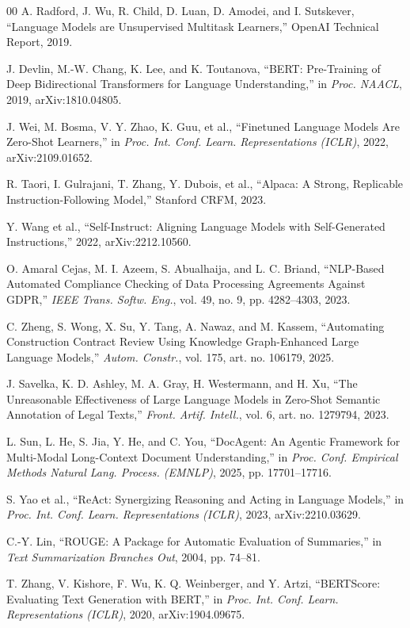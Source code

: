\documentclass[conference]{IEEEtran}
\begin{document}
\begin{thebibliography}{00}
A. Radford, J. Wu, R. Child, D. Luan, D. Amodei, and I. Sutskever, ``Language Models are Unsupervised Multitask Learners,'' OpenAI Technical Report, 2019.

J. Devlin, M.-W. Chang, K. Lee, and K. Toutanova, ``BERT: Pre-Training of Deep Bidirectional Transformers for Language Understanding,'' in \textit{Proc. NAACL}, 2019, arXiv:1810.04805.

J. Wei, M. Bosma, V. Y. Zhao, K. Guu, et al., ``Finetuned Language Models Are Zero-Shot Learners,'' in \textit{Proc. Int. Conf. Learn. Representations (ICLR)}, 2022, arXiv:2109.01652.

R. Taori, I. Gulrajani, T. Zhang, Y. Dubois, et al., ``Alpaca: A Strong, Replicable Instruction-Following Model,'' Stanford CRFM, 2023.

Y. Wang et al., ``Self-Instruct: Aligning Language Models with Self-Generated Instructions,'' 2022, arXiv:2212.10560.

O. Amaral Cejas, M. I. Azeem, S. Abualhaija, and L. C. Briand, ``NLP-Based Automated Compliance Checking of Data Processing Agreements Against GDPR,'' \textit{IEEE Trans. Softw. Eng.}, vol. 49, no. 9, pp. 4282--4303, 2023.

C. Zheng, S. Wong, X. Su, Y. Tang, A. Nawaz, and M. Kassem, ``Automating Construction Contract Review Using Knowledge Graph-Enhanced Large Language Models,'' \textit{Autom. Constr.}, vol. 175, art. no. 106179, 2025.

J. Savelka, K. D. Ashley, M. A. Gray, H. Westermann, and H. Xu, ``The Unreasonable Effectiveness of Large Language Models in Zero-Shot Semantic Annotation of Legal Texts,'' \textit{Front. Artif. Intell.}, vol. 6, art. no. 1279794, 2023.

L. Sun, L. He, S. Jia, Y. He, and C. You, ``DocAgent: An Agentic Framework for Multi-Modal Long-Context Document Understanding,'' in \textit{Proc. Conf. Empirical Methods Natural Lang. Process. (EMNLP)}, 2025, pp. 17701--17716.

S. Yao et al., ``ReAct: Synergizing Reasoning and Acting in Language Models,'' in \textit{Proc. Int. Conf. Learn. Representations (ICLR)}, 2023, arXiv:2210.03629.

C.-Y. Lin, ``ROUGE: A Package for Automatic Evaluation of Summaries,'' in \textit{Text Summarization Branches Out}, 2004, pp. 74--81.

T. Zhang, V. Kishore, F. Wu, K. Q. Weinberger, and Y. Artzi, ``BERTScore: Evaluating Text Generation with BERT,'' in \textit{Proc. Int. Conf. Learn. Representations (ICLR)}, 2020, arXiv:1904.09675.

\end{thebibliography}
\end{document}

